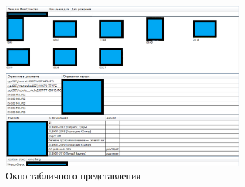 \documentclass[12pt]{article}
\begin{document}
\begin{figure}[!ht]
    \centering
    \includegraphics[width=0.8\textwidth]{_images/table_view.png}
    \caption*{Окно табличного представления}
\end{figure}
\pagebreak
\end{document}
